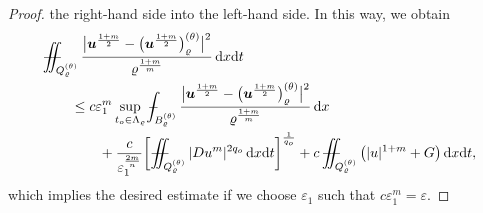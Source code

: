 \documentclass[a4paper, 10pt, american]{amsart}
\numberwithin{theorem}{section}
\numberwithin{equation}{section}
\newcommand{\dxdt}{\,\mathrm{d}x\mathrm{d}t}
\newcommand{\dx}{\,\mathrm{d}x}
\renewcommand{\epsilon}{\varepsilon}
\renewcommand{\epsilon}{\varepsilon}
\renewcommand{\rho}{\varrho}
\newcommand{\power}[2]{\bm{#1^{\mbox{\unboldmath{\scriptsize$#2$}}}}}
\def\Xint#1{\mathchoice
    {\XXint\displaystyle\textstyle{#1}}%
    {\XXint\textstyle\scriptstyle{#1}}%
    {\XXint\scriptstyle\scriptscriptstyle{#1}}%
    {\XXint\scriptscriptstyle\scriptscriptstyle{#1}}%
    \!\int}
\def\XXint#1#2#3{\setbox0=\hbox{$#1{#2#3}{\int}$}
    \vcenter{\hbox{$#2#3$}}\kern-0.5\wd0}
\def\bint{\Xint-}
\def\Xiint#1{\mathchoice
    {\XXiint\displaystyle\textstyle{#1}}%
    {\XXiint\textstyle\scriptstyle{#1}}%
    {\XXiint\scriptstyle\scriptscriptstyle{#1}}%
    {\XXiint\scriptscriptstyle\scriptscriptstyle{#1}}%
    \!\iint}
\def\XXiint#1#2#3{\setbox0=\hbox{$#1{#2#3}{\iint}$}
    \vcenter{\hbox{$#2#3$}}\kern-0.5\wd0}
\def\biint{\Xiint{-\!-}}
\begin{document}
\begin{proof}
the right-hand side into the left-hand side. In this way, we obtain 
\begin{align}
\nonumber
&\biint_{Q_{\rho}^{(\theta)}}\frac{\big|\power u{\frac{1+m}2} - \big( \power u{\frac{1+m}2}\big)_{\rho}^{(\theta)}\big|^2}{\rho^{\frac{1+m}m}} \dxdt \\\nonumber
&\qquad\le
c\epsilon_1^m \sup_{t_o\in\Lambda_\rho}\bint_{B_{\rho}^{(\theta)}}\frac{\big|\power u{\frac{1+m}2} - \big( \power u{\frac{1+m}2}\big)_{\rho}^{(\theta)}\big|^2}{\rho^{\frac{1+m}m}} \dx\\
&\qquad\qquad+
\frac{c}{\epsilon_1^{\frac{2m}n}}\bigg[ \biint_{Q_\rho^{(\theta)}} |Du^m|^{2q_o}\dxdt\bigg]^{\frac1{q_o}}
+
 c\,\biint_{Q_\rho^{(\theta)}} \big( |u|^{1+m} +G \big) \dxdt,
\end{align}
which implies the desired estimate if we choose $\epsilon_1$ such that $c\epsilon_1^m=\epsilon$.




\end{proof}
\end{document}
